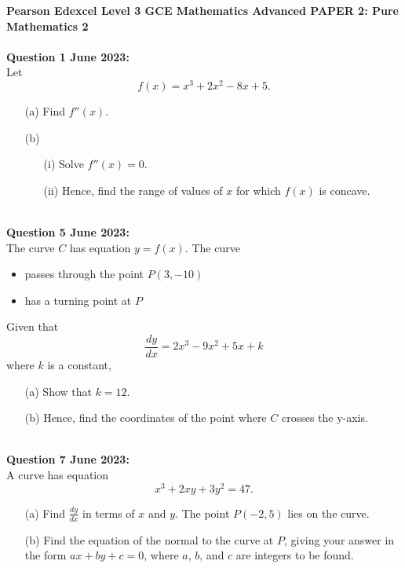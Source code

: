 \documentclass[12pt]{article}
\begin{document}
\textbf{Pearson Edexcel Level 3 GCE Mathematics
Advanced PAPER 2: Pure Mathematics 2}\\\\
\textbf{Question 1 June 2023:}\\
Let \[f(x) = x^3 + 2x^2 - 8x + 5.\]
\begin{enumerate}
    \item[(a)] Find \( f''(x) \). 
    \item[(b)] 
    \begin{enumerate}
        \item[(i)] Solve \( f''(x) = 0 \).
        \item[(ii)] Hence, find the range of values of \( x \) for which \( f(x) \) is concave.\\\\
    \end{enumerate}
\end{enumerate}

\textbf{Question 5 June 2023:}\\
The curve \( C \) has equation \( y = f(x) \). The curve
\begin{itemize}
    \item passes through the point \( P(3, -10) \)
    \item has a turning point at \( P \)
\end{itemize}

Given that 
\[\frac{dy}{dx} = 2x^3 - 9x^2 + 5x + k\]
where \( k \) is a constant,
\begin{enumerate}
    \item[(a)] Show that \( k = 12 \).
    \item[(b)] Hence, find the coordinates of the point where \( C \) crosses the y-axis.\\\\
\end{enumerate}

\textbf{Question 7 June 2023:}\\
A curve has equation
\[x^3 + 2xy + 3y^2 = 47.\]
\begin{enumerate}
    \item[(a)] Find \( \frac{dy}{dx} \) in terms of \( x \) and \( y \). 
    The point \( P(-2, 5) \) lies on the curve.    
    \item[(b)] Find the equation of the normal to the curve at \( P \), giving your answer in the form \( ax + by + c = 0 \), where \( a \), \( b \), and \( c \) are integers to be found.\\\\
\end{enumerate}
\end{document}
